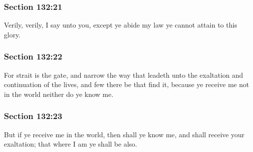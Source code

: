 	\subsubsection{Section 132:21} %
		\label{DC132-21}

		Verily, verily, I say unto you, except ye abide my law ye cannot attain to this glory.


	\subsubsection{Section 132:22} %
		\label{DC132-22}

		For strait is the gate, and narrow the way that leadeth unto the exaltation and continuation of the lives, and few there be that find it, because ye receive me not in the world neither do ye know me.


	\subsubsection{Section 132:23} %
		\label{DC132-23}

		But if ye receive me in the world, then shall ye know me, and shall receive your exaltation; that where I am ye shall be also.


